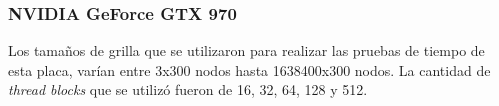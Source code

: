 \newpage

\subsubsection{NVIDIA GeForce GTX 970}

Los tamaños de grilla que se utilizaron para realizar las pruebas de tiempo de esta placa, varían entre 3x300 nodos hasta 1638400x300 nodos. La cantidad de \textit{thread blocks} que se utilizó fueron de 16, 32, 64, 128 y 512.

